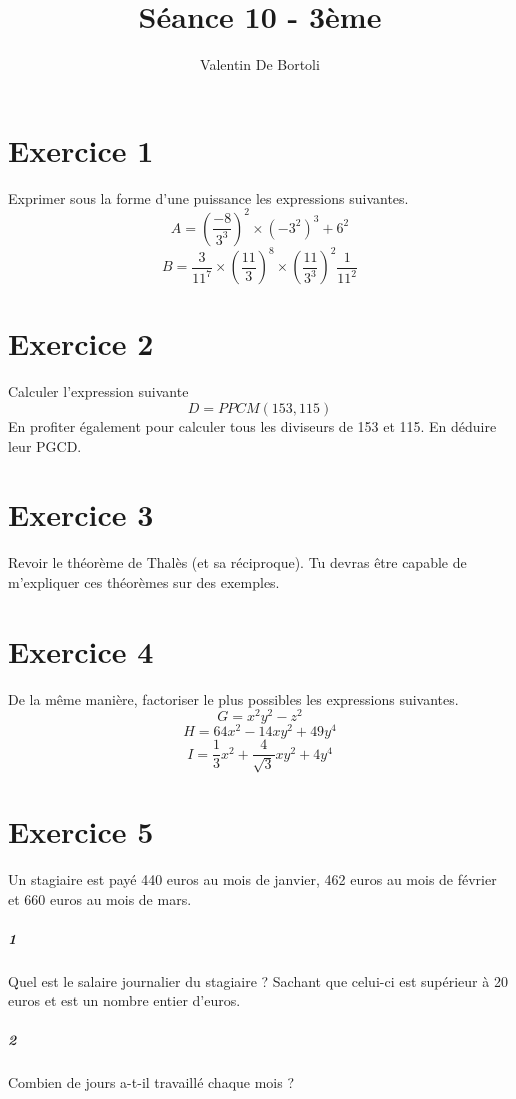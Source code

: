 \documentclass[10pt,a4paper]{article}
\title{Séance 10 - 3ème}
\author{Valentin De Bortoli}
\begin{document}
\maketitle
\section{Exercice 1}
Exprimer sous la forme d'une puissance les expressions suivantes.
\begin{equation}
A=\left( \frac{-8}{3^3}\right)^2 \times (-3^2)^3 +6^2
\end{equation}
\begin{equation}
B=\frac{3}{11^7}\times \left( \frac{11}{3} \right)^8 \times\left( \frac{11}{3^3} \right)^2 \frac{1}{11^2}
\end{equation}
\section{Exercice 2}
Calculer l'expression suivante
\begin{equation}
D=PPCM(153,115)
\end{equation}
En profiter également pour calculer tous les diviseurs de 153 et 115. En déduire leur PGCD.
\section{Exercice 3}
Revoir le théorème de Thalès (et sa réciproque). Tu devras être capable de m'expliquer ces théorèmes sur des exemples.
\section{Exercice 4}
De la même manière, factoriser le plus possibles les expressions suivantes.
\begin{equation}
G=x^2y^2-z^2
\end{equation}
\begin{equation}
H=64x^2-14xy^2+49y^4
\end{equation}
\begin{equation}
I=\frac{1}{3}x^2+\frac{4}{\sqrt{3}}xy^2+4y^4
\end{equation}
\section{Exercice 5}
Un stagiaire est payé 440 euros au mois de janvier, 462 euros au mois de février et 660 euros au mois de mars.
\subparagraph{1}Quel est le salaire journalier du stagiaire ? Sachant que celui-ci est supérieur à 20 euros et est un nombre entier d'euros.
\subparagraph{2}Combien de jours a-t-il travaillé chaque mois ?
\end{document}
